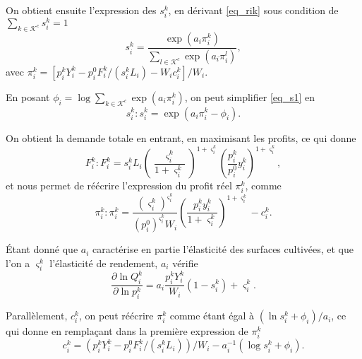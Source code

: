 On obtient ensuite l’expression des $s_i^k$, en dérivant \ref{eq_rik} sous condition de $\sum_{k\in \mathcal{K}^c} s_i^k = 1$
\begin{equation}\label{eq_s1}
    s_i^k = \frac{\exp(a_i \pi_i^k)}{\sum_{l \in \mathcal{K}^c} \exp(a_i \pi_i^l)},
\end{equation}
avec $\pi_i^k = [p_i^k Y_i^k - p_i^0 F_i^k/(s_i^k L_i) - W_i c_i^k]/W_i$.

En posant $\phi_i = \log \sum_{k \in \mathcal{K}^c} \exp(a_i \pi_i^k)$, on peut simplifier \ref{eq_s1} en
\begin{equation}\label{eq_sik}
    s_i^k: s_i^k = \exp(a_i \pi_i^k - \phi_i).
\end{equation}

On obtient la demande totale en entrant, en maximisant les profits, ce qui donne
\begin{equation}
    F_i^k: F_i^k = s_i^k L_i \left( \frac{\varsigma_i^k}{1+\varsigma_i^k} \right)^{1+\varsigma_i^k} \left( \frac{p_i^k}{p_i^0} y_i^k \right)^{1+\varsigma_i^k},
\end{equation}
et nous permet de réécrire l’expression du profit réel $\pi_i^k$, comme
\begin{equation}
    \pi_i^k : \pi_i^k = \frac{\left( \varsigma_i^k \right)^{\varsigma_i^k}}{\left(  p_i^0 \right)^{\varsigma_i^k}W_i} \left( \frac{p_i^k y_i^k}{1+\varsigma_i^k }\right)^{1+\varsigma_i^k} - c_i^k.
\end{equation}

Étant donné que $a_i$ caractérise en partie l’élasticité des surfaces cultivées, et que l’on a $\varsigma_i^k$ l’élasticité de rendement, $a_i$ vérifie
\begin{equation*}
    \frac{\partial \ln Q_i^k}{\partial \ln p_i^k} = a_i \frac{p_i^k Y_i^k}{W_i}(1 - s_i^k) + \varsigma_i^k.
\end{equation*}

Parallèlement, $c_i^k$, on peut réécrire $\pi_i^k$ comme étant égal à $(\ln s_i^k + \phi_i)/a_i$, ce qui donne en remplaçant dans la première expression de $\pi_i^k$
\begin{equation*}
    c_i^k= \left( p_i^k Y_i^k - p_i^0 F_i^k / \left( s_i^k L_i \right) \right) / W_i - a_i^{-1} \left( \log s_i^k + \phi_i \right).
\end{equation*}

